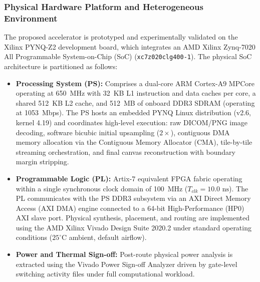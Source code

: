 \documentclass[conference]{IEEEtran}
\begin{document}
\subsubsection{Physical Hardware Platform and Heterogeneous Environment}
The proposed accelerator is prototyped and experimentally validated on the Xilinx PYNQ-Z2 development board, which integrates an AMD Xilinx Zynq-7020 All Programmable System-on-Chip (SoC) (\texttt{xc7z020clg400-1}). The physical SoC architecture is partitioned as follows:
\begin{itemize}
    \item \textbf{Processing System (PS):} Comprises a dual-core ARM Cortex-A9 MPCore operating at 650~MHz with 32~KB L1 instruction and data caches per core, a shared 512~KB L2 cache, and 512~MB of onboard DDR3 SDRAM (operating at 1053~Mbps). The PS hosts an embedded PYNQ Linux distribution (v2.6, kernel 4.19) and coordinates high-level execution: raw DICOM/PNG image decoding, software bicubic initial upsampling ($2\times$), contiguous DMA memory allocation via the Contiguous Memory Allocator (CMA), tile-by-tile streaming orchestration, and final canvas reconstruction with boundary margin stripping.
    \item \textbf{Programmable Logic (PL):} Artix-7 equivalent FPGA fabric operating within a single synchronous clock domain of 100~MHz ($T_{clk} = 10.0\text{ ns}$). The PL communicates with the PS DDR3 subsystem via an AXI Direct Memory Access (AXI DMA) engine connected to a 64-bit High-Performance (HP0) AXI slave port. Physical synthesis, placement, and routing are implemented using the AMD Xilinx Vivado Design Suite 2020.2 under standard operating conditions ($25^\circ\text{C}$ ambient, default airflow).
    \item \textbf{Power and Thermal Sign-off:} Post-route physical power analysis is extracted using the Vivado Power Sign-off Analyzer driven by gate-level switching activity files under full computational workload.
\end{itemize}
\end{document}
